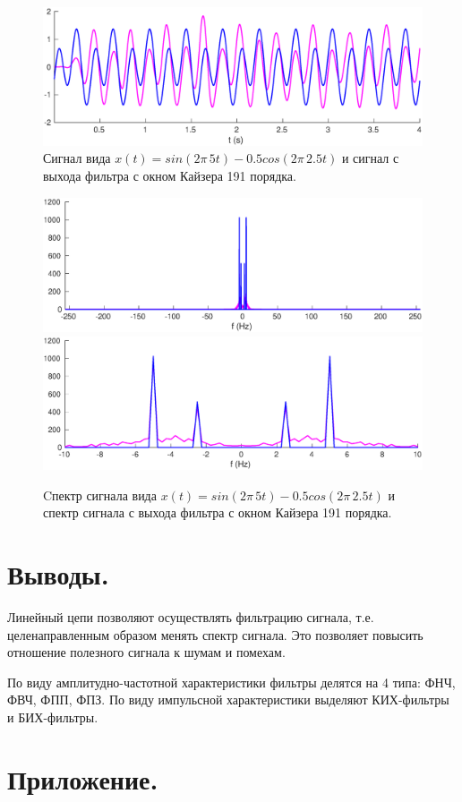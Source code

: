 \documentclass[a4paper,14pt]{extarticle}
\begin{document}
\begin{figure}[H]
\centering
\includegraphics[width=1\textwidth]{signal_filtered.eps}
\captionsetup{justification=centering,margin=0.5cm}
\caption{Сигнал вида $x(t) = sin(2\pi \, 5 t) - 0.5 cos(2\pi \, 2.5 t)$ и сигнал с выхода фильтра с окном Кайзера 191 порядка.}
\label{sig_filt}
\end{figure}

\begin{figure}[H]
\centering
\includegraphics[width=1\textwidth]{spectrum_filtered.eps}
\includegraphics[width=1\textwidth]{spectrum_filtered_zoomed.eps}
\captionsetup{justification=centering,margin=0.5cm}
\caption{Cпектр сигнала вида $x(t) = sin(2\pi \, 5 t) - 0.5 cos(2\pi \, 2.5 t)$ и спектр сигнала с выхода фильтра с окном Кайзера 191 порядка.}
\label{spec_filt}
\end{figure}

\section{Выводы.}

Линейный цепи позволяют осуществлять фильтрацию сигнала, т.е. целенаправленным образом менять спектр сигнала. Это позволяет повысить отношение полезного сигнала к шумам и помехам.

По виду амплитудно-частотной характеристики фильтры делятся на 4 типа: ФНЧ, ФВЧ, ФПП, ФПЗ.
По виду импульсной характеристики выделяют КИХ-фильтры и БИХ-фильтры.



\section{Приложение.}


\end{document}
